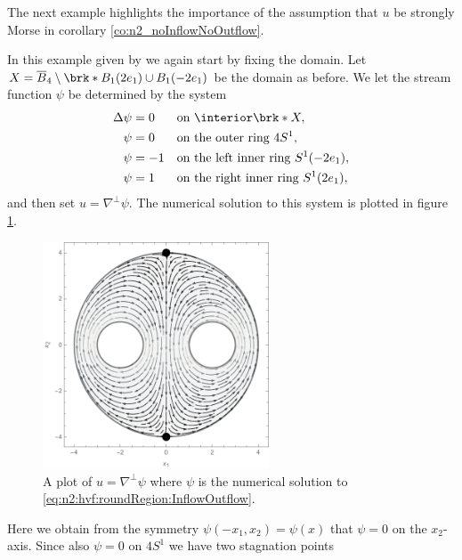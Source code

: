 The next example highlights the importance of the assumption that $u$ be strongly Morse in corollary \ref{co:n2_noInflowNoOutflow}.
\begin{example}\label{ex:n2_noInflowOutflow_irregular}
  In this example given by \cite{Wahlen2023} we again start by fixing the domain.
  Let $X=\overline{B}_4\setminus\brk*{B_1(2e_1)\cup B_1(-2e_1)}$ be the domain as before.
  We let the stream function $\psi$ be determined by the system
  \begin{equation}
    \begin{aligned}
      \Delta \psi&=0 &&\text{on }\openX, \\
      \psi&=0 &&\text{on the outer ring }4S^1, \\
      \psi&=-1 &&\text{on the left inner ring }S^1(-2e_1), \\
      \psi&=1 &&\text{on the right inner ring }S^1(2e_1),
    \end{aligned}\label{eq:n2:hvf:roundRegion:InflowOutflow}
  \end{equation}
  and then set $u=\nabla^\perp\psi$.
  The numerical solution to this system is plotted in figure \ref{pl:n2_hvf_roundRegion_InflowOutflow}.
  \begin{figure}
    \centering
    \includegraphics[width=0.6\textwidth]{../Plots/n2_hvf_roundRegion_InflowOutflow_gray_2.pdf}
    \caption{A plot of $u=\nabla^\perp\psi$ where $\psi$ is the numerical solution to
    \eqref{eq:n2:hvf:roundRegion:InflowOutflow}.}
    \label{pl:n2_hvf_roundRegion_InflowOutflow}
  \end{figure}
  Here we obtain from the symmetry $\psi(-x_1,x_2)=\psi(x)$ that $\psi=0$ on
  the $x_2$-axis. Since also $\psi=0$ on $4S^1$ we have two stagnation points

\end{example}

